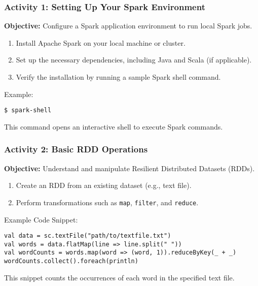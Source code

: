 \documentclass[aspectratio=169]{beamer}
\begin{document}
\begin{frame}[fragile]
    \frametitle{Activity 1: Setting Up Your Spark Environment}
    \textbf{Objective:} Configure a Spark application environment to run local Spark jobs.

    \begin{enumerate}
        \item Install Apache Spark on your local machine or cluster.
        \item Set up the necessary dependencies, including Java and Scala (if applicable).
        \item Verify the installation by running a sample Spark shell command.
    \end{enumerate}

    \begin{block}{Example:}
        \begin{lstlisting}
$ spark-shell
        \end{lstlisting}
    This command opens an interactive shell to execute Spark commands.
    \end{block}
\end{frame}

\begin{frame}[fragile]
    \frametitle{Activity 2: Basic RDD Operations}
    \textbf{Objective:} Understand and manipulate Resilient Distributed Datasets (RDDs).

    \begin{enumerate}
        \item Create an RDD from an existing dataset (e.g., text file).
        \item Perform transformations such as \texttt{map}, \texttt{filter}, and \texttt{reduce}.
    \end{enumerate}

    \begin{block}{Example Code Snippet:}
        \begin{lstlisting}
val data = sc.textFile("path/to/textfile.txt")
val words = data.flatMap(line => line.split(" "))
val wordCounts = words.map(word => (word, 1)).reduceByKey(_ + _)
wordCounts.collect().foreach(println)
        \end{lstlisting}
    This snippet counts the occurrences of each word in the specified text file.
    \end{block}
\end{frame}
\end{document}
